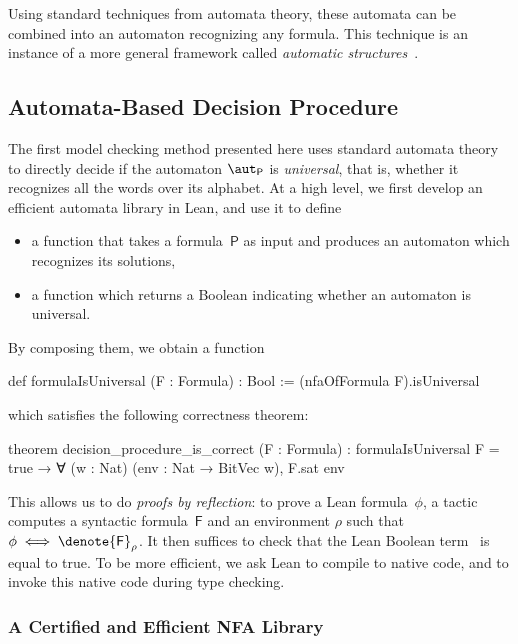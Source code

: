 %
Using standard techniques from automata theory, these automata can be combined
into an automaton recognizing any formula.
%
This technique is an instance of a more general framework called \emph{automatic
structures}~\citep{automatic-structures}.

\subsection{Automata-Based Decision Procedure}
\label{sec:swbv:automata}

The first model checking method presented here uses standard automata theory to
directly decide if the automaton $\aut_{\mathsf{P}}$ is \emph{universal}, that
is, whether it recognizes all the words over its alphabet.
%
At a high level, we first develop an efficient automata library in Lean, and
use it to define
\begin{itemize}
  \item a function  that takes a
    formula~$\mathsf{P}$ as input and produces an automaton which recognizes its
    solutions,
  \item a function  which returns a Boolean
    indicating whether an automaton is universal.
\end{itemize}
%
By composing them, we obtain a function
\begin{lean}
  def formulaIsUniversal (F : Formula) : Bool :=
    (nfaOfFormula F).isUniversal
\end{lean}
which satisfies the following correctness theorem:

\begin{lean}
  theorem decision_procedure_is_correct (F : Formula) :
      formulaIsUniversal F = true → ∀ (w : Nat) (env : Nat → BitVec w), F.sat env
\end{lean}

This allows us to do \emph{proofs by reflection}: to prove a Lean
formula~$\phi$, a tactic computes a syntactic formula~$\mathsf{F}$ and an
environment $\rho$ such that $\phi \iff \denote{\mathsf{F}}_\rho$.
%
It then suffices to check that the Lean Boolean
term~ is equal to true.
%
To be more efficient, we ask Lean to compile
 to native code, and to invoke this native
code during type checking.

\subsubsection{A Certified and Efficient NFA Library}


